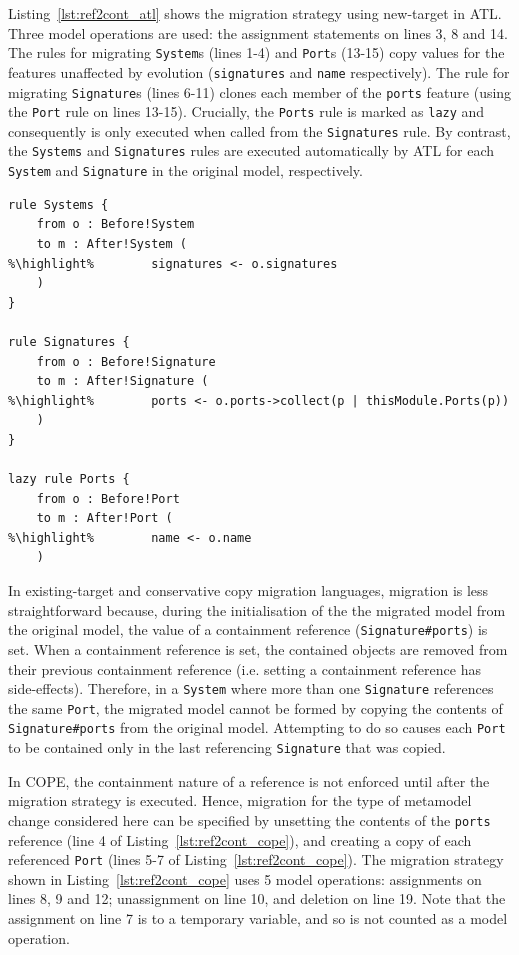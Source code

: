 Listing~\ref{lst:ref2cont_atl} shows the migration strategy using new-target in ATL. Three model operations are used: the assignment statements on lines 3, 8 and 14. The rules for migrating \texttt{System}s (lines 1-4) and \texttt{Port}s (13-15) copy values for the features unaffected by evolution (\texttt{signatures} and \texttt{name} respectively). The rule for migrating \texttt{Signature}s (lines 6-11) clones each member of the \texttt{ports} feature (using the \texttt{Port} rule on lines 13-15). Crucially, the \texttt{Ports} rule is marked as \texttt{lazy} and consequently is only executed when called from the \texttt{Signatures} rule. By contrast, the \texttt{Systems} and \texttt{Signatures} rules are executed automatically by ATL for each \texttt{System} and \texttt{Signature} in the original model, respectively. 

\begin{lstlisting}[float=tbp, caption= Migration for Change Reference to Containment in ATL, label=lst:ref2cont_atl, language=ATL, tabsize=2]
rule Systems {
	from o : Before!System
	to m : After!System (
%\highlight%		signatures <- o.signatures
	)
}

rule Signatures {
	from o : Before!Signature
	to m : After!Signature (
%\highlight%		ports <- o.ports->collect(p | thisModule.Ports(p))
	)
}

lazy rule Ports {
	from o : Before!Port
	to m : After!Port (
%\highlight%		name <- o.name
	)
\end{lstlisting}

In existing-target and conservative copy migration languages, migration is less straightforward because, during the initialisation of the the migrated model from the original model, the value of a containment reference (\texttt{Signature\#ports}) is set. When a containment reference is set, the contained objects are removed from their previous containment reference (i.e. setting a containment reference has side-effects). Therefore, in a \texttt{System} where more than one \texttt{Signature} references the same \texttt{Port}, the migrated model cannot be formed by copying the contents of \texttt{Signature\#ports} from the original model. Attempting to do so causes each \texttt{Port} to be contained only in the last referencing \texttt{Signature} that was copied.

In COPE, the containment nature of a reference is not enforced until after the migration strategy is executed. Hence, migration for the type of metamodel change considered here can be specified by unsetting the contents of the \texttt{ports} reference (line 4 of Listing~\ref{lst:ref2cont_cope}), and creating a copy of each referenced \texttt{Port} (lines 5-7 of Listing~\ref{lst:ref2cont_cope}). The migration strategy shown in Listing~\ref{lst:ref2cont_cope} uses 5 model operations: assignments on lines 8, 9 and 12; unassignment on line 10, and deletion on line 19. Note that the assignment on line 7 is to a temporary variable, and so is not counted as a model operation. 


